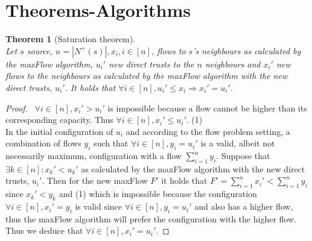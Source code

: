 \documentclass[11pt]{article}
\newtheorem{theorem}{Theorem}[section]
\theoremstyle{definition}
\theoremstyle{corollary}
\theoremstyle{lemma}
\begin{document}
  \section{Theorems-Algorithms}
    \begin{theorem}[Saturation theorem] \ \\ 
    \label{saturation}
       Let $s$ source, $n = |N^{+}(s)|, x_i, i \in [n]$, flows to $s$'s neighbours as calculated by the
       maxFlow algorithm, $u_i'$ new direct trusts to the $n$ neighbours and $x_i'$ new flows to the neighbours
       as calculated by the maxFlow algorithm with the new direct trusts, $u_i'$. It holds that
       $\forall i \in [n], u_i' \leq x_i \Rightarrow x_i' = u_i'$.
    \end{theorem}
    \begin{proof} \ 
       $\forall i \in [n], x_i' > u_i'$ is impossible because a flow cannot be higher than its
       corresponding capacity. Thus $\forall i \in [n], x_i' \leq u_i'$. (1) \\
       In the initial configuration of $u_i$ and according to the flow problem setting, a combination of flows
       $y_i$ such that $\forall i \in [n], y_i = u_i'$ is a valid, albeit not necessarily maximum,
       configuration with a flow $\sum\limits_{i=1}^{n}y_i$. Suppose that $\exists k \in [n] : x_k'
       < u_k'$ as calculated by the maxFlow algorithm with the new direct trusts, $u_i'$. Then for the new
       maxFlow $F'$ it holds that $F' = \sum\limits_{i=1}^{n}x_i' < \sum\limits_{i=1}^{n}y_i$ since $x_k' < y_k$
       and (1) which is impossible because the configuration $\forall i \in [n], x_i' = y_i$ is valid since 
       $\forall i \in [n], y_i = u_i'$ and also has a higher flow, thus the maxFlow algorithm will
       prefer the configuration with the higher flow. Thus we deduce that $\forall i \in [n], x_i' = u_i'$.
    \end{proof}
\end{document}
